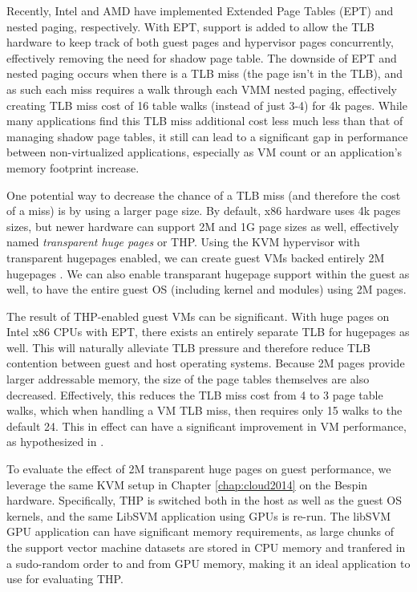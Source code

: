 Recently, Intel and AMD have implemented Extended Page Tables (EPT) and nested paging, respectively.  With EPT, support is added to allow the TLB hardware to keep track of both guest pages and hypervisor pages concurrently, effectively removing the need for shadow page table. The downside of EPT and nested paging occurs when there is a TLB miss (the page isn't in the TLB), and as such each miss requires a walk through each VMM nested paging, effectively creating TLB miss cost of 16 table walks (instead of just 3-4) for 4k pages. While many applications find this TLB miss additional cost less much less than that of managing shadow page tables, it still can lead to a significant gap in performance between non-virtualized applications, especially as VM count or an application's memory footprint increase. 

One potential way to decrease the chance of a TLB miss (and therefore the cost of a miss) is by using a larger page size. By default, x86 hardware uses 4k pages sizes, but newer hardware can support 2M and 1G page sizes as well, effectively named \emph{transparent huge pages} or THP.  Using the KVM hypervisor with transparent hugepages enabled, we can create guest VMs backed entirely 2M hugepages \cite{redhat2010thp}. We can also enable transparant hugepage support within the guest as well, to have the entire guest OS (including kernel and modules) using 2M pages. 

The result of THP-enabled guest VMs can be significant. With huge pages on Intel x86 CPUs with EPT, there exists an entirely separate TLB for hugepages as well. This will naturally alleviate TLB pressure and therefore reduce TLB contention between guest and host operating systems. Because 2M pages provide larger addressable memory, the size of the page tables themselves are also decreased.  Effectively, this reduces the TLB miss cost from 4 to 3 page table walks, which when handling a VM TLB miss, then requires only 15 walks to the default 24. This in effect can have a significant improvement in VM performance, as hypothesized in \cite{redhat2010thp}.

To evaluate the effect of 2M transparent huge pages on guest performance, we leverage the same KVM setup in Chapter \ref{chap:cloud2014} on the Bespin hardware. Specifically, THP is switched both in the host as well as the guest OS kernels, and the same LibSVM application using GPUs is re-run. The libSVM GPU application can have significant memory requirements, as large chunks of the support vector machine datasets are stored in CPU memory and tranfered in a sudo-random order to and from GPU memory, making it an ideal application to use for evaluating THP.



